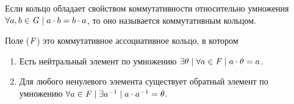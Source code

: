\begin{definition}
  Если кольцо обладает свойством коммутативности относительно умножения
  \(\forall a, b \in \mathit{G} \mid a \cdot b = b \cdot a\), то оно называется
  коммутативным кольцом.
\end{definition}
\begin{definition}
  Поле ($\mathit{F}$) это коммутативное ассоциативное кольцо, в котором

  \begin{enumerate}
  \item
    Есть нейтральный элемент по умножению \(\exists \theta \mid \forall a \in
    \mathit{F} \mid a \cdot \theta = a\).
  \item
    Для любого ненулевого элемента существует обратный элемент по умножению
    \(\forall a \in \mathit{F} \mid \exists a^{-1} \mid a \cdot a^{-1} =
    \theta\).
  \end{enumerate}
\end{definition}
